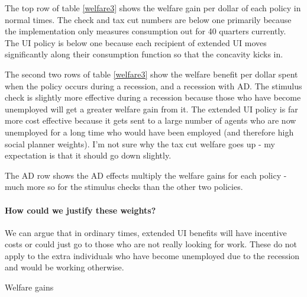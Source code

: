 \documentclass[11pt]{article}
\begin{document}
	The top row of table \ref{welfare3} shows the welfare gain per dollar of each policy in normal times. The check and tax cut numbers are below one primarily because the implementation only measures consumption out for 40 quarters currently. The UI policy is below one because each recipient of extended UI moves significantly along their consumption function so that the concavity kicks in.
	
	The second two rows of table \ref{welfare3} show the welfare benefit per dollar spent when the policy occurs during a recession, and a recession with AD. The stimulus check is slightly more effective during a recession because those who have become unemployed will get a greater welfare gain from it. The extended UI policy is far more cost effective because it gets sent to a large number of agents who are now unemployed for a long time who would have been employed (and therefore high social planner weights). I'm not sure why the tax cut welfare goes up - my expectation is that it should go down slightly.
	
	The AD row shows the AD effects multiply the welfare gains for each policy - much more so for the stimulus checks than the other two policies.
	
	\paragraph{How could we justify these weights?}
	We can argue that in ordinary times, extended UI benefits will have incentive costs or could just go to those who are not really looking for work. These do not apply to the extra individuals who have become unemployed due to the recession and would be working otherwise.
	\begin{table} 
	\center
	
	\caption{Welfare gains}
	\label{welfare3}
	\end{table}
	
	
\end{document}
